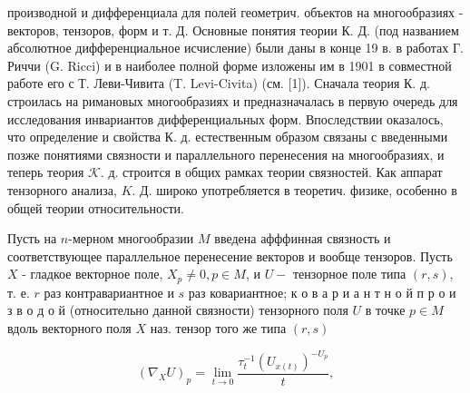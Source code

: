 \documentclass[10pt]{article}
\begin{document}
производной и дифференциала для полей геометрич. объектов на многообразиях - векторов, тензоров, форм и т. Д. Основные понятия теории К. Д. (под названием абсолютное дифференциальное исчисление) были даны в конце 19 в. в работах Г. Риччи (G. Ricci) и в наиболее полной форме изложены им в 1901 в совместной работе его с Т. Леви-Чивита (T. Levi-Civita) (см. [1]). Сначала теория К. д. строилась на римановых многообразиях и предназначалась в первую очередь для исследования инвариантов дифференциальных форм. Впоследствии оказалось, что определение и свойства К. д. естественным образом связаны с введенными позже понятиями связности и параллельного перенесения на многообразиях, и теперь теория $\mathcal{K}$. д. строится в общих рамках теории связностей. Как аппарат тензорного анализа, $K$. Д. широко употребляется в теоретич. физике, особенно в общей теории относительности.



Пусть на $n$-мерном многообразии $M$ введена афффинная связность и соответствующее параллельное перенесение векторов и вообще тензоров. Пусть $X$ - гладкое векторное поле, $X_{p} \neq 0, p \in M$, и $U-$ тензорное поле типа $(r, s)$, т. е. $r$ раз контравариантное и $s$ раз ковариантное; к о в а р и а н т н о й п р о и з в о д о й (относительно данной связности) тензорного поля $U$ в точке $p \in M$ вдоль векторного поля $X$ наз. тензор того же типа $(r, s)$



\[

\left(\nabla_{X} U\right)_{p}=\lim _{t \rightarrow 0} \frac{\tau_{t}^{-1}\left(U_{x(t)}\right)^{-U_{p}}}{t},

\]
\end{document}
